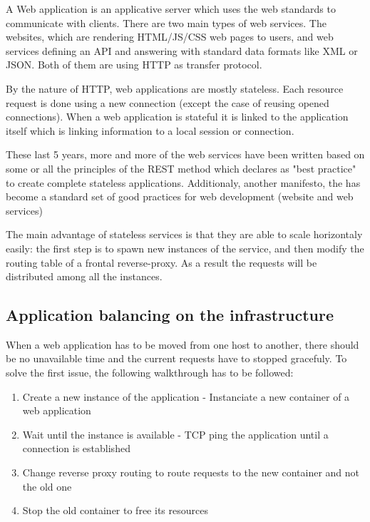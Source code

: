 A Web application is an applicative server which uses the web standards to
communicate with clients. There are two main types of web services. The
websites, which are rendering HTML/JS/CSS web pages to users, and web services
defining an API and answering with standard data formats like XML or JSON. Both
of them are using HTTP as transfer protocol.

By the nature of HTTP, web applications are mostly stateless. Each resource
request is done using a new connection (except the case of reusing opened
connections). When a web application is stateful it is linked to the
application itself which is linking information to a local session or
connection.

These last 5 years, more and more of the web services have been written based
on some or all the principles of the REST method which declares as "best
practice" to create complete stateless applications. Additionaly, another
manifesto, the \cite{website12Factors} has become a standard set of good
practices for web development (website and web services)

The main advantage of stateless services is that they are able to scale
horizontaly easily: the first step is to spawn new instances of the service,
and then modify the routing table of a frontal reverse-proxy. As a result the
requests will be distributed among all the instances.

\subsection{Application balancing on the infrastructure}

When a web application has to be moved from one host to another, there should
be no unavailable time and the current requests have to stopped gracefuly. To
solve the first issue, the following walkthrough has to be followed:

\begin{enumerate}
	\item{Create a new instance of the application - Instanciate a new
	container of a web application}
	\item{Wait until the instance is available - TCP ping the application
	until a connection is established}
	\item{Change reverse proxy routing to route requests to the new
	container and not the old one}
	\item{Stop the old container to free its resources}
\end{enumerate}

